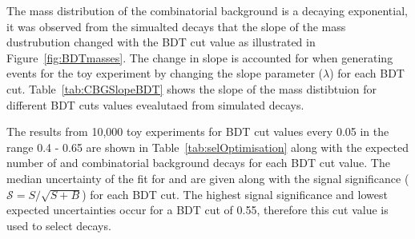 The mass distribution of the combinatorial background is a decaying exponential, it was observed from the simualted \bbbarmumux decays that the slope of the mass dustrubution changed with the BDT cut value as illustrated in Figure~\ref{fig:BDTmasses}. The change in slope is accounted for when generating events for the toy experiment by changing the slope parameter ($\lambda$) for each BDT cut. Table~\ref{tab:CBGSlopeBDT} shows the slope of the mass distibtuion for different BDT cuts values evealutaed from \bbbarmumux simulated decays.

The results from 10,000 toy experiments for BDT cut values every 0.05 in the range 0.4 - 0.65 are shown in Table~\ref{tab:selOptimisation} along with the expected number of \bsmumu and combinatorial background decays for each BDT cut value. The median uncertainty of the fit for \tmumu and \invtmumu are given along with the signal significance ($\mathcal{S} = S/\sqrt{S+B}$) for each BDT cut. The highest signal significance and lowest expected uncertainties occur for a BDT cut of 0.55, therefore this cut value is used to select \bsmumu decays. 


